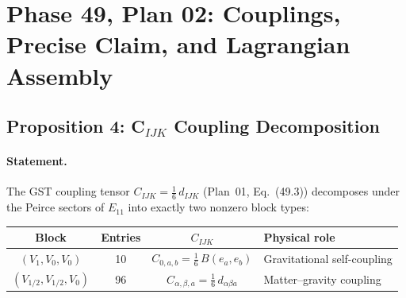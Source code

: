 
%

\section*{Phase 49, Plan 02: Couplings, Precise Claim, and Lagrangian Assembly}


\subsection*{Proposition 4: C$_{IJK}$ Coupling Decomposition}

\paragraph{Statement.}
The GST coupling tensor $C_{IJK} = \frac{1}{6}\, d_{IJK}$
(Plan~01, Eq.~(49.3)) decomposes under the Peirce sectors of $E_{11}$
into exactly two nonzero block types:

\begin{center}
\begin{tabular}{c|c|c|l}
\hline
\textbf{Block} & \textbf{Entries} & $C_{IJK}$ & \textbf{Physical role} \\
\hline
$(V_1, V_0, V_0)$ & 10 & $C_{0,a,b} = \frac{1}{6}\, B(e_a, e_b)$ &
  Gravitational self-coupling \\
\hline
$(V_{1/2}, V_{1/2}, V_0)$ & 96 & $C_{\alpha,\beta,a} = \frac{1}{6}\, d_{\alpha\beta a}$ &
  Matter--gravity coupling \\
\hline
\end{tabular}
\end{center}


